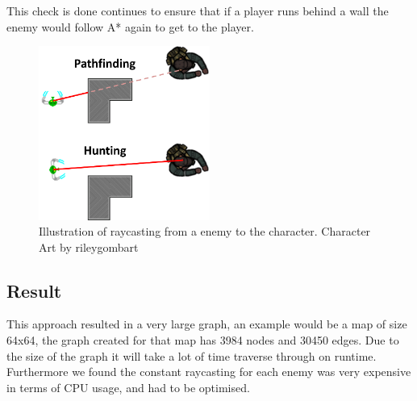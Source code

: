 This check is done continues to ensure that if a player runs behind a wall the enemy would follow A* again to get to the player.
\begin{figure}[H]
\begin{center}
	\includegraphics[width=0.5\textwidth]{figures/astar/raycast}
	\caption{Illustration of raycasting from a enemy to the character. Character Art by rileygombart \cite{artist}}
	\label{raycast}
\end{center}
\end{figure}

\subsection*{Result}
This approach resulted in a very large graph, an example would be a map of size 64x64, the graph created for that map has 3984 nodes and 30450 edges. Due to the size of the graph it will take a lot of time traverse through on runtime.
Furthermore we found the constant raycasting for each enemy was very expensive in terms of CPU usage, and had to be optimised.
